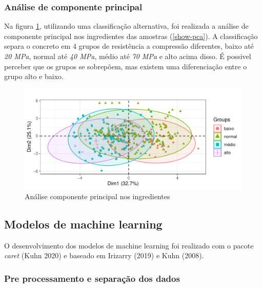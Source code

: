 \documentclass[]{article}
\begin{document}
\hypertarget{anuxe1lise-de-componente-principal}{%
\subsubsection{Análise de componente
principal}\label{anuxe1lise-de-componente-principal}}

Na figura \ref{fig:pca}, utilizando uma classificação alternativa, foi
realizada a análise de componente principal nos ingredientes das
amostras (\ref{show-pca}). A classificação separa o concreto em 4 grupos
de resistência a compressão diferentes, baixo até \emph{20 MPa}, normal
até \emph{40 MPa}, médio até \emph{70 MPa} e alto acima disso. É
possivel perceber que os grupos se sobrepõem, mas existem uma
diferenciação entre o grupo alto e baixo.

\begin{figure}

{\centering \includegraphics{paper_PT_files/figure-latex/pca-1} 

}

\caption{Análise componente principal nos ingredientes}\label{fig:pca}
\end{figure}

\hypertarget{modelos-de-machine-learning}{%
\subsection{Modelos de machine
learning}\label{modelos-de-machine-learning}}

O desenvolvimento dos modelos de machine learning foi realizado com o
pacote \emph{caret} (Kuhn 2020) e baseado em Irizarry (2019) e Kuhn
(2008).

\hypertarget{pre-processamento-e-separauxe7uxe3o-dos-dados}{%
\subsubsection{Pre processamento e separação dos
dados}\label{pre-processamento-e-separauxe7uxe3o-dos-dados}}
\end{document}

